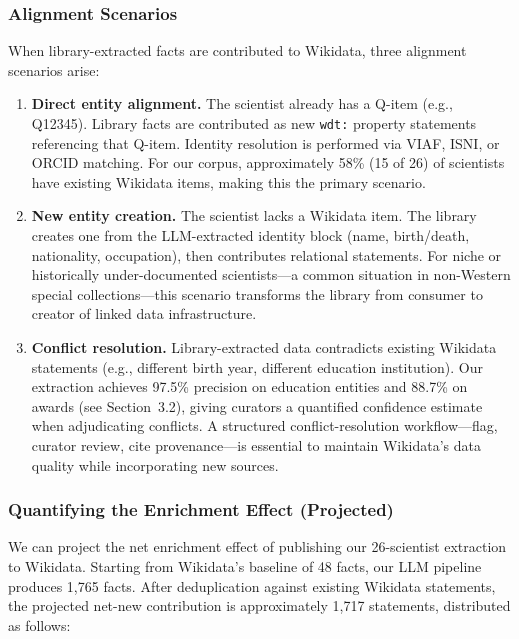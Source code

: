 \documentclass[review]{elsarticle}
\begin{document}
\subsubsection{Alignment Scenarios}

When library-extracted facts are contributed to Wikidata, three alignment scenarios arise:

\begin{enumerate}[label=\textbf{S\arabic*:},leftmargin=*]
    \item \textbf{Direct entity alignment.} The scientist already has a Q-item (e.g., Q12345). Library facts are contributed as new \texttt{wdt:} property statements referencing that Q-item. Identity resolution is performed via VIAF, ISNI, or ORCID matching. For our corpus, approximately 58\% (15 of 26) of scientists have existing Wikidata items, making this the primary scenario.
    \item \textbf{New entity creation.} The scientist lacks a Wikidata item. The library creates one from the LLM-extracted identity block (name, birth/death, nationality, occupation), then contributes relational statements. For niche or historically under-documented scientists—a common situation in non-Western special collections—this scenario transforms the library from consumer to creator of linked data infrastructure.
    \item \textbf{Conflict resolution.} Library-extracted data contradicts existing Wikidata statements (e.g., different birth year, different education institution). Our extraction achieves 97.5\% precision on education entities and 88.7\% on awards (see Section~3.2), giving curators a quantified confidence estimate when adjudicating conflicts. A structured conflict-resolution workflow—flag, curator review, cite provenance—is essential to maintain Wikidata's data quality while incorporating new sources.
\end{enumerate}

\subsubsection{Quantifying the Enrichment Effect (Projected)}

We can project the net enrichment effect of publishing our 26-scientist extraction to Wikidata. Starting from Wikidata's baseline of 48 facts, our LLM pipeline produces 1,765 facts. After deduplication against existing Wikidata statements, the projected net-new contribution is approximately 1,717 statements, distributed as follows:
\end{document}

